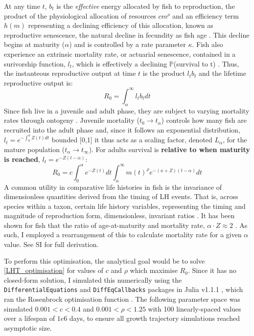\documentclass[a4paper]{article} %
\begin{document}
At any time $t$, $b_{t}$ is the \textit{effective} energy allocated by fish to reproduction, the product of the physiological allocation of resources $cm^{\rho}$ and an efficiency term $h(m)$ representing a declining efficiency of this allocation, known as reproductive senescence, the natural decline in fecundity as fish age \autocite{Stearns2000, Benoit2018, Vrtilek2018}. This decline begins at maturity ($\alpha$) and is controlled by a rate parameter $\kappa$. Fish also experience an extrinsic mortality rate, or actuarial senescence, contained in a surivorship function, $l_t$, which is effectively a declining $\mathbb{P}$(survival to t) \autocite{Peterson1984, Charnov1993, Charnov2001, Benoit2018, Laird2010, Reznick2002, Reznick2006}. Thus, the instanteous reproductive output at time $t$ is the product $l_{t}b_{t}$ and the lifetime reproductive output is:
\begin{equation}
    R_{0} = \int_{\alpha}^{\infty}l_{t}b_{t} dt
\end{equation}
Since fish live in a juvenile and adult phase, they are subject to varying mortality rates through ontogeny \autocite{Charnov2001}. Juvenile mortality ($t_0 \rightarrow t_{\alpha}$) controls how many fish are recruited into the adult phase and, since it follows an exponential distribution, $l_t = e^{-\int_{0}^{\alpha}Z(t)dt}$ bounded [0,1] it thus acts as a scaling factor, denoted $L_{\alpha}$, for the mature population ($t_{\alpha} \rightarrow t_{\infty}$). For adults survival is \textbf{relative to when maturity is reached}, $l_{t} = e^{-Z(t-\alpha)}$:
\begin{equation}
    R_{0} = c\int_{0}^{\alpha}e^{-Z(t)}dt\int_{\alpha}^{\infty} m(t)^{\rho} e^{-(\kappa+Z)(t-\alpha)} dt \label{LHT_optimisation}
\end{equation}
A common utility in comparative life histories in fish is the invariance of dimensionless quantities derived from the timing of LH events. That is, across species within a taxon, certain life history variables, representing the timing and magnitude of reproduction form, dimensionless, invariant ratios \autocite{Charnov1993}. It has been shown for fish that the ratio of age-at-maturity and mortality rate, $\alpha\cdot Z \approx 2$ \autocite{Charnov1993}. As such, I employed a rearrangement of this to calculate mortality rate for a given $\alpha$ value.
See SI for full derivation.

To perform this optimisation, the analytical goal would be to solve \eqref{LHT_optimisation} for values of $c$ and $\rho$ which maximise $R_0$. Since it has no closed-form solution, I simulated this numerically using the \texttt{DifferentialEquations} and \texttt{DiffEqCallbacks} packages in Julia v1.1.1 \autocite{Bezanson2017}, which ran the Rosenbrock optimisation function \autocite{Rosenbrock1960}. The following parameter space was simulated $0.001 < c < 0.4$ and $0.001 < \rho < 1.25$ with 100 linearly-spaced values over a lifespan of $1e6$ days, to ensure all growth trajectory simulations reached asymptotic size.
\end{document}
